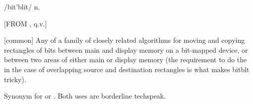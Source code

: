  /bit'blit/ n.

[FROM , q.v.]
\begin{inparaenum}
    \item {[}common] Any of a family of closely related algorithms for moving
        and copying rectangles of bits between main and display memory on a
        bit-mapped device, or between two areas of either main or display memory
        (the requirement to do the  in the case of
        overlapping source and destination rectangles is what makes
        bitblt tricky).
    \item Synonym for  or . Both uses are
        borderline techspeak.
\end{inparaenum}

